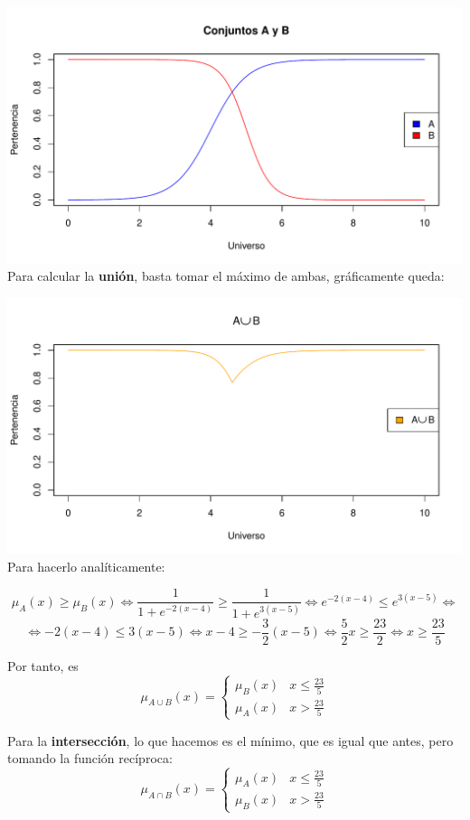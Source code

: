 \documentclass[
]{article}
\begin{document}
\includegraphics{tareaBloque3_files/figure-latex/unnamed-chunk-1-1.pdf}
\newpage Para calcular la \textbf{unión}, basta tomar el máximo de
ambas, gráficamente queda:

\includegraphics{tareaBloque3_files/figure-latex/unnamed-chunk-2-1.pdf}
Para hacerlo analíticamente:

\[\mu_{A}\left(x\right)\geq\mu_{B}\left(x\right)\iff\frac{1}{1+e^{-2\left(x-4\right)}}\geq\frac{1}{1+e^{3\left(x-5\right)}}\iff e^{-2\left(x-4\right)}\leq e^{3\left(x-5\right)}\iff\]
\[\iff-2\left(x-4\right)\leq3\left(x-5\right)\iff x-4\geq-\frac{3}{2}\left(x-5\right)\iff\frac{5}{2}x\geq\frac{23}{2}\iff x\geq\frac{23}{5}\]

Por tanto, es \[\mu_{A\cup B}\left(x\right)=\begin{cases}
\mu_{B}\left(x\right) & x\leq\frac{23}{5}\\
\mu_{A}\left(x\right) & x>\frac{23}{5}
\end{cases}\]

Para la \textbf{intersección}, lo que hacemos es el mínimo, que es igual
que antes, pero tomando la función recíproca:
\[\mu_{A\cap B}\left(x\right)=\begin{cases}
\mu_{A}\left(x\right) & x\leq\frac{23}{5}\\
\mu_{B}\left(x\right) & x>\frac{23}{5}
\end{cases}\]
\end{document}
